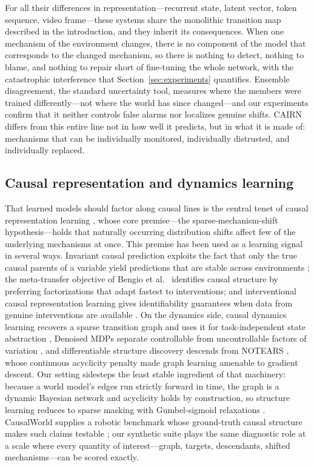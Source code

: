 \documentclass[preprint,12pt]{elsarticle}
\theoremstyle{definition}
\theoremstyle{remark}
\begin{document}
For all their differences in representation---recurrent state, latent
vector, token sequence, video frame---these systems share the monolithic
transition map described in the introduction, and they inherit its
consequences. When one mechanism of the environment changes, there is no
component of the model that corresponds to the changed mechanism, so
there is nothing to detect, nothing to blame, and nothing to repair
short of fine-tuning the whole network, with the catastrophic
interference that Section~\ref{sec:experiments} quantifies. Ensemble
disagreement, the standard uncertainty tool, measures where the members
were trained differently---not where the world has since changed---and
our experiments confirm that it neither controls false alarms nor
localizes genuine shifts. CAIRN differs from this entire line not in how
well it predicts, but in what it is made of: mechanisms that can be
individually monitored, individually distrusted, and individually
replaced.

\subsection{Causal representation and dynamics learning}

That learned models should factor along causal lines is the central
tenet of causal representation learning \citep{scholkopf2021toward},
whose core premise---the sparse-mechanism-shift hypothesis---holds that
naturally occurring distribution shifts affect few of the underlying
mechanisms at once. This premise has been used as a learning signal in
several ways. Invariant causal prediction exploits the fact that only
the true causal parents of a variable yield predictions that are stable
across environments \citep{peters2016invariant}; the meta-transfer
objective of Bengio et al.\ \citep{bengio2020meta} identifies causal structure by
preferring factorizations that adapt fastest to interventions; and
interventional causal representation learning gives identifiability
guarantees when data from genuine interventions are available
\citep{ahuja2023interventional}. On the dynamics side, causal dynamics
learning recovers a sparse transition graph and uses it for
task-independent state abstraction \citep{wang2022causal}, Denoised
MDPs separate controllable from uncontrollable factors of variation
\citep{wang2022denoised}, and differentiable structure discovery
descends from NOTEARS \citep{zheng2018dags}, whose continuous
acyclicity penalty made graph learning amenable to gradient descent.
Our setting sidesteps the least stable ingredient of that machinery:
because a world model's edges run strictly forward in time, the graph
is a dynamic Bayesian network and acyclicity holds by construction, so
structure learning reduces to sparse masking with Gumbel-sigmoid
relaxations \citep{jang2017categorical,maddison2017concrete}.
CausalWorld supplies a robotic benchmark whose ground-truth causal
structure makes such claims testable \citep{ahmed2021causalworld}; our
synthetic suite plays the same diagnostic role at a scale where every
quantity of interest---graph, targets, descendants, shifted
mechanisms---can be scored exactly.
\end{document}
